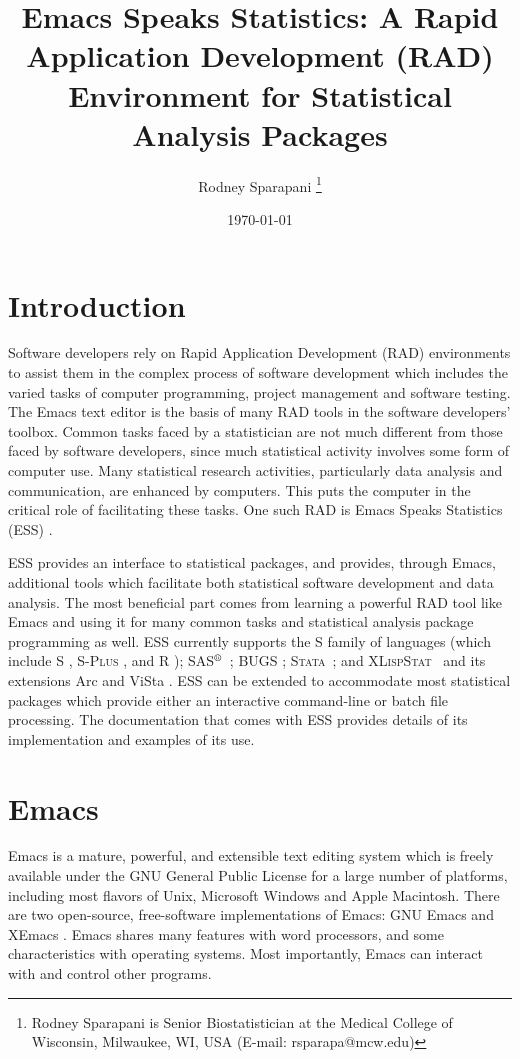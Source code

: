 \documentclass{article}
\title{Emacs Speaks Statistics:  A Rapid Application Development (RAD)
  Environment for Statistical Analysis Packages}
\author{Rodney Sparapani \footnote{%
Rodney Sparapani is Senior Biostatistician at the Medical College
of Wisconsin, Milwaukee, WI, USA (E-mail: rsparapa@mcw.edu)}}
\date{\today}
\newcommand*{\SAS}{\textsc{SAS}$^{\mbox{\scriptsize\textregistered}}$}
\newcommand*{\Splus}{\textsc{S-Plus}}
\newcommand*{\XLispStat}{\textsc{XLispStat}}
\newcommand*{\Stata}{\textsc{Stata}}
\begin{document}
\maketitle


\section{Introduction}
\label{sec:introduction}

Software developers rely on Rapid Application Development (RAD)
environments to assist them in the complex process of software
development which includes the varied tasks of computer
programming, project management and software testing.  The Emacs text
editor is the basis of many RAD tools in the software developers' toolbox.
Common tasks faced by a statistician are not much different from those
faced by software developers, since much statistical
activity involves some form of computer use.  Many
statistical research activities, particularly data analysis and
communication, are enhanced by computers.  This puts the computer
in the critical role of facilitating these
tasks.  One such RAD is Emacs Speaks Statistics (ESS) \citep{ESS}.

ESS provides an interface to statistical packages, and provides,
through Emacs, additional tools which facilitate both statistical
software development and data analysis.  The most beneficial part  
comes from learning a powerful RAD tool like Emacs and using it for 
many common tasks and statistical analysis package programming as well. 
ESS currently supports the S family of languages (which include
S \citep{BecRCW88,ChaJH92,ChaJ98}, \Splus{} \citep{Splus}, and R
\citep{ihak:gent:1996}); \SAS\ \citep{SAS:8};  BUGS \citep{BUGS}; 
\Stata\ \citep{Stata:6.0}; and \XLispStat\
\citep{Tier90} and its extensions Arc \citep{Cook:Weisberg:1999} and
ViSta \citep{youn:fald:mcfa:1992}.  ESS can be
extended to accommodate most statistical packages which provide either
an interactive command-line or batch file processing.  The documentation 
that comes with ESS provides details of its implementation and examples 
of its use.


\section{Emacs}
\label{sec:emacs}

Emacs is a mature, powerful, and extensible text editing system which
is freely available under the GNU General Public License for a large
number of platforms, including most flavors of Unix, Microsoft Windows
and Apple Macintosh.  There are two open-source, free-software
implementations of Emacs:  GNU Emacs \citep{GNU-Emacs} and XEmacs
\citep{XEmacs}.  Emacs shares many features with
word processors, and some characteristics with operating systems.
Most importantly, Emacs can interact with and control other programs.
\end{document}
